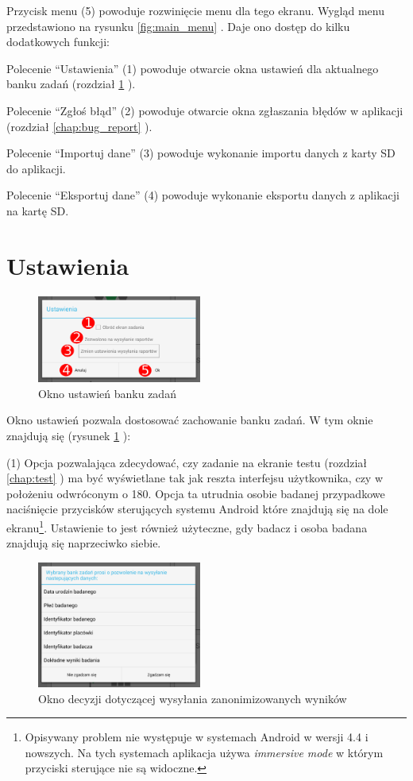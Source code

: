 \documentclass[a4paper,10pt,twosided]{book}
\newcommand{\refwithpage}[3]{
\ref{#1}\ifthenelse{\equal{\thepage}{\pageref{#1}}}{}{#2\pageref{#1}#3}%
}
\newcommand{\pref}[1]{\refwithpage{#1}{ (strona }{)}}
\newcommand{\ppref}[1]{\refwithpage{#1}{ -- strona }{}}
\begin{document}
Przycisk menu (5) powoduje rozwinięcie menu dla tego ekranu. Wygląd menu przedstawiono na rysunku \pref{fig:main_menu}. Daje ono dostęp do kilku dodatkowych funkcji:

Polecenie ``Ustawienia'' (1) powoduje otwarcie okna ustawień dla aktualnego banku zadań (rozdział \ppref{sec:main_settings}).

Polecenie ``Zgłoś błąd'' (2) powoduje otwarcie okna zgłaszania błędów w aplikacji (rozdział \ppref{chap:bug_report}).

Polecenie ``Importuj dane'' (3) powoduje wykonanie importu danych z karty SD do aplikacji.

Polecenie ``Eksportuj dane'' (4) powoduje wykonanie eksportu danych z aplikacji na kartę SD.


\section{Ustawienia}
\label{sec:main_settings}

\begin{figure}[h!]
\centering
\includegraphics[width=0.48\textwidth]{activity_main-settings.pdf}
\caption{Okno ustawień banku zadań}
\label{fig:main_settings}
\end{figure}

Okno ustawień pozwala dostosować zachowanie banku zadań. W tym oknie znajdują się (rysunek \ppref{fig:main_settings}):

(1) Opcja pozwalająca zdecydować, czy zadanie na ekranie testu (rozdział \ppref{chap:test}) ma być wyświetlane tak jak reszta interfejsu użytkownika, czy w położeniu odwróconym o 180\textdegree. Opcja ta utrudnia osobie badanej przypadkowe naciśnięcie przycisków sterujących systemu Android które znajdują się na dole ekranu\footnote{Opisywany problem nie występuje w systemach Android w wersji 4.4 i nowszych. Na tych systemach aplikacja używa \emph{immersive mode} w którym przyciski sterujące nie są widoczne.}. Ustawienie to jest również użyteczne, gdy badacz i osoba badana znajdują się naprzeciwko siebie.

\begin{figure}
\includegraphics[width=0.48\textwidth]{activity_main-settings_result_submit_approval.png}
\caption{Okno decyzji dotyczącej wysyłania zanonimizowanych wyników}
\label{fig:main_settings_results}
\end{figure}
\end{document}

